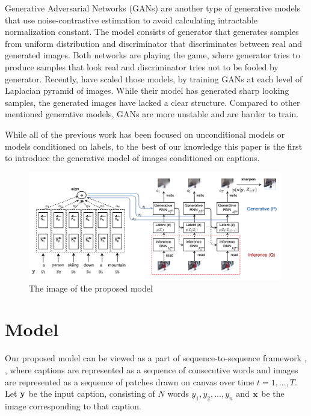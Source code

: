 \documentclass{article} %
\newcommand{\icaption}{{\bf{y}}}
\newcommand{\oimage}{{\bf{x}}}
\begin{document}
Generative Adversarial Networks (GANs) \citep{goodfellow_gan} are another type of generative models that use noise-contrastive estimation \citep{gutmann_nce} to avoid calculating intractable normalization constant. The model consists of generator that generates samples from uniform distribution and discriminator that discriminates between real and generated images. Both networks are playing the game, where generator tries to produce samples that look real and discriminator tries not to be fooled by generator. Recently, \cite{denton_lapgan} have scaled those models, by training GANs at each level of Laplacian pyramid of images. While their model has generated sharp looking samples, the generated images have lacked a clear structure. Compared to other mentioned generative models, GANs are more unstable and are harder to train.

While all of the previous work has been focused on unconditional models or models conditioned on labels, to the best of our knowledge this paper is the first to introduce the generative model of images conditioned on captions.

\begin{figure}[!t]
\captionsetup[subfigure]{labelformat=empty}
\begin{center}
\includegraphics[width=0.99\textwidth]{figures/alignDrawAnnotated.pdf}\quad
%
\end{center}
\caption{The image of the proposed model}
\label{fig:figmodel}
\vspace{-0.3cm}
\end{figure}

\section{Model}
Our proposed model can be viewed as a part of sequence-to-sequence framework \citep{ilya_mt}, \citep{cho_mt}, \citep{nitish_video} where captions are represented as a sequence of consecutive words and images are represented as a sequence of patches drawn on canvas over time $t=1,...,T$. Let $\icaption$ be the input caption, consisting of $N$ words $y_{1}, y_{2}, ..., y_{n}$ and $\oimage$ be the image corresponding to that caption.
\end{document}
